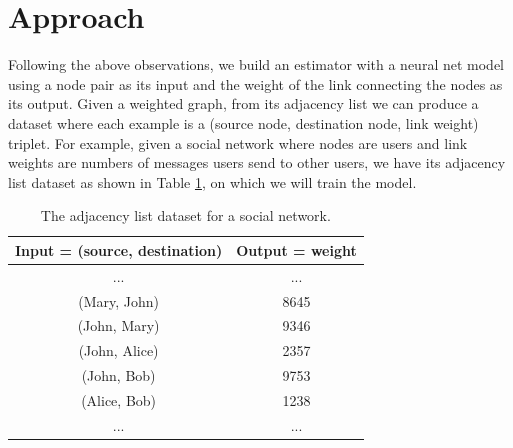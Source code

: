 \documentclass[12pt]{WSUThesis}
\theoremstyle{definition}
\begin{document}
\section{Approach}
Following the above observations,
we build an estimator with a neural net model using a node pair as its input
and the weight of the link connecting the nodes as its output.
Given a weighted graph, from its adjacency list we can produce a dataset where each example is a (source node, destination node, link weight) triplet.
For example, given a social network where nodes are users and link weights are numbers of messages users send to other users, we have its adjacency list dataset as shown in Table \ref{tab:link-list-dataset}, on which we will train the model.
\begin{table}[ht] \centering
	\caption{The adjacency list dataset for a social network.}
	\begin{tabular}{cc} \\ \hline
		\textbf{Input = (source, destination)} & \textbf{Output = weight} \\ \hline
		...                        & ... \\ \hline
		(Mary, John) & 8645 \\ \hline
		(John, Mary) & 9346 \\ \hline
		(John, Alice) & 2357 \\ \hline
		(John, Bob) & 9753 \\ \hline
		(Alice, Bob) & 1238 \\ \hline
		...                        & ... \\ \hline
	\end{tabular}
	\label{tab:link-list-dataset}
\end{table}
\end{document}

